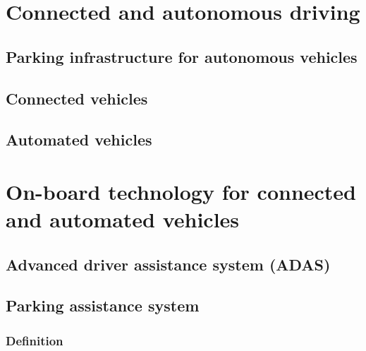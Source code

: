 \documentclass[
]{book}
\begin{document}
\hypertarget{connected}{%
\chapter{Connected and autonomous driving}\label{connected}}

\hypertarget{parking_av}{%
\section{Parking infrastructure for autonomous vehicles}\label{parking_av}}

\hypertarget{connected_veh}{%
\section{Connected vehicles}\label{connected_veh}}

\hypertarget{av}{%
\section{Automated vehicles}\label{av}}

\hypertarget{onboard}{%
\chapter{On-board technology for connected and automated vehicles}\label{onboard}}

\hypertarget{adas}{%
\section{Advanced driver assistance system (ADAS)}\label{adas}}

\hypertarget{parking_assistance}{%
\section{Parking assistance system}\label{parking_assistance}}

\hypertarget{definition-14}{%
\subsection*{Definition}\label{definition-14}}
\end{document}
